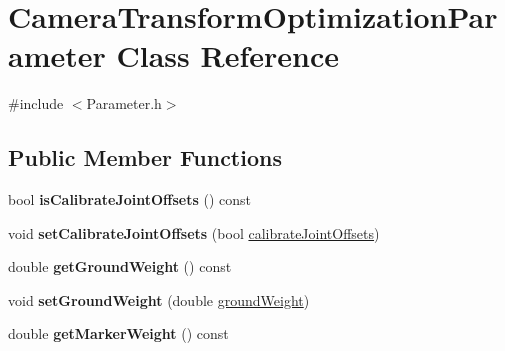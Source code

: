 \hypertarget{classCameraTransformOptimizationParameter}{\section{\-Camera\-Transform\-Optimization\-Parameter \-Class \-Reference}
\label{classCameraTransformOptimizationParameter}
}


{\ttfamily \#include $<$\-Parameter.\-h$>$}

\subsection*{\-Public \-Member \-Functions}
\begin{DoxyCompactItemize}
\item 
\hypertarget{classCameraTransformOptimizationParameter_a15a72c66430e5314c3b67eb17b542c01}{bool {\bfseries is\-Calibrate\-Joint\-Offsets} () const }\label{classCameraTransformOptimizationParameter_a15a72c66430e5314c3b67eb17b542c01}

\item 
\hypertarget{classCameraTransformOptimizationParameter_af9ada2a406b8f506f45ee46b59a35947}{void {\bfseries set\-Calibrate\-Joint\-Offsets} (bool \hyperlink{classCameraTransformOptimizationParameter_a6ad5c2d68c9a05b28fd3e0ec0e1c68e0}{calibrate\-Joint\-Offsets})}\label{classCameraTransformOptimizationParameter_af9ada2a406b8f506f45ee46b59a35947}

\item 
\hypertarget{classCameraTransformOptimizationParameter_a034d7040f507c93d72197f830d0295fa}{double {\bfseries get\-Ground\-Weight} () const }\label{classCameraTransformOptimizationParameter_a034d7040f507c93d72197f830d0295fa}

\item 
\hypertarget{classCameraTransformOptimizationParameter_a583817e21a6cb2131a6b4c4bcb1b131d}{void {\bfseries set\-Ground\-Weight} (double \hyperlink{classCameraTransformOptimizationParameter_a6903913052edf580ad47b3e68da6b173}{ground\-Weight})}\label{classCameraTransformOptimizationParameter_a583817e21a6cb2131a6b4c4bcb1b131d}

\item 
\hypertarget{classCameraTransformOptimizationParameter_a7619723a6549afc3074df2ac230100ea}{double {\bfseries get\-Marker\-Weight} () const }\label{classCameraTransformOptimizationParameter_a7619723a6549afc3074df2ac230100ea}


\end{DoxyCompactItemize}
